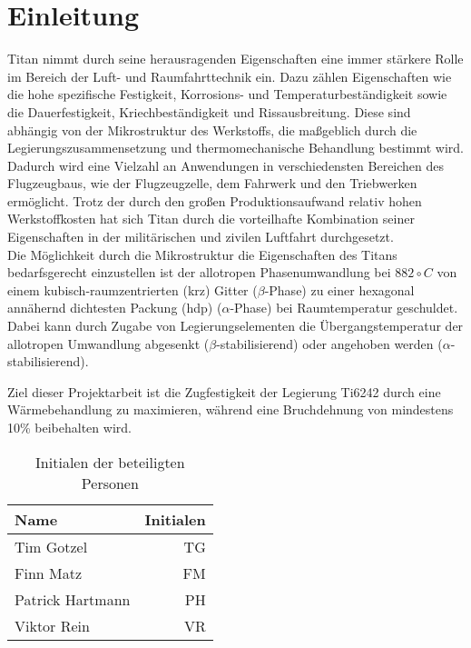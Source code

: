 \chapter{Einleitung} 
Titan nimmt durch seine herausragenden Eigenschaften eine immer stärkere Rolle im Bereich der Luft- und Raumfahrttechnik ein. Dazu zählen Eigenschaften wie die hohe spezifische Festigkeit, Korrosions- und Temperaturbeständigkeit sowie die Dauerfestigkeit, Kriechbeständigkeit und Rissausbreitung. Diese sind abhängig von der Mikrostruktur des Werkstoffs, die maßgeblich durch die Legierungszusammensetzung und thermomechanische Behandlung bestimmt wird. Dadurch wird eine Vielzahl an Anwendungen in verschiedensten Bereichen des Flugzeugbaus, wie der Flugzeugzelle, dem Fahrwerk und den Triebwerken ermöglicht. Trotz der durch den großen Produktionsaufwand relativ hohen Werkstoffkosten hat sich Titan durch die vorteilhafte Kombination seiner Eigenschaften in der militärischen und zivilen Luftfahrt durchgesetzt. \\ 
Die Möglichkeit durch die Mikrostruktur die Eigenschaften des Titans bedarfsgerecht einzustellen ist der allotropen Phasenumwandlung bei $882\circ C$ von einem kubisch-raumzentrierten (krz) Gitter ($\beta$-Phase) zu einer hexagonal annähernd dichtesten Packung (hdp) ($\alpha$-Phase) bei Raumtemperatur geschuldet. Dabei kann durch Zugabe von Legierungselementen die Übergangstemperatur der allotropen Umwandlung abgesenkt ($\beta$-stabilisierend) oder angehoben werden ($\alpha$-stabilisierend). 



Ziel dieser Projektarbeit ist die Zugfestigkeit der Legierung Ti6242 durch eine Wärmebehandlung zu maximieren, während eine Bruchdehnung von mindestens 10\% beibehalten wird.  

\begin{table}[h] 
	\centering 
	\begin{tabular}{lr} 
		
		Name & \hspace{0.5cm} Initialen\\ 
		\hline 
		Tim Gotzel & TG\\ 
		Finn Matz & FM\\ 
		Patrick Hartmann & PH \\ 
		Viktor Rein & VR\\ 
		\hline 
		
	\end{tabular} 
	\caption{Initialen der beteiligten Personen} 
	\label{tab:initialien} 
\end{table} 

